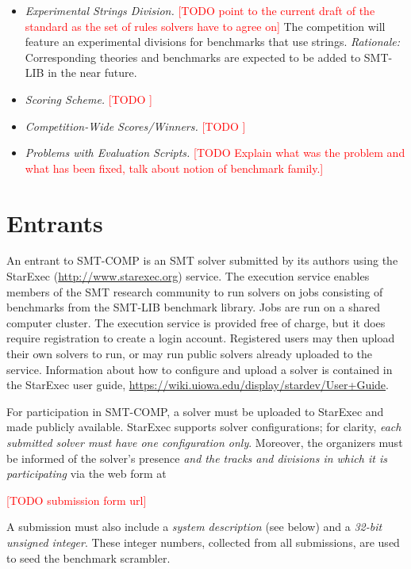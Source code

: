 \documentclass[12pt]{article}
\newcommand{\rem}[1]{\textcolor{red}{[#1]}}
\newcommand{\todo}[1]{\rem{TODO #1}}
\begin{document}
\begin{itemize}
  \item {\it Experimental Strings Division.}
    \todo{point to the current draft of the standard as the set of rules
    solvers have to agree on}
    The competition will feature an experimental divisions for
  benchmarks that use strings.  \emph{Rationale:} Corresponding
  theories and benchmarks are expected to be added to SMT-LIB in the
  near future.

  \item {\it Scoring Scheme.} \todo{}

  \item {\it Competition-Wide Scores/Winners.} \todo{}

  \item {\it Problems with Evaluation Scripts.} \todo{Explain what was the
    problem and what has been fixed, talk about notion of benchmark family.}

\end{itemize}


\section{Entrants}
\label{sec:entrants}

%
An entrant to SMT-COMP is an SMT solver submitted by its authors using
the StarExec (\url{http://www.starexec.org}) service.  The execution
service enables members of the SMT research community to run solvers
on jobs consisting of benchmarks from the SMT-LIB benchmark library.
Jobs are run on a shared computer cluster.  The execution service is
provided free of charge, but it does require registration to create a
login account.  Registered users may then upload their own solvers to
run, or may run public solvers already uploaded to the service.
Information about how to configure and upload a solver is contained in
the StarExec user guide,
\url{https://wiki.uiowa.edu/display/stardev/User+Guide}.

For participation in SMT-COMP, a solver must be uploaded to StarExec
and made publicly available.  StarExec supports solver configurations;
for clarity, \emph{each submitted solver must have one configuration
  only}.  Moreover, the organizers must be informed of the solver's
presence \emph{and the tracks and divisions in which it is
  participating} via the web form at
\begin{center}
  \todo{\url{}submission form url}
\end{center}
A submission must also include a \emph{system description} (see below) and a
\emph{32-bit unsigned integer}.
 These integer numbers, collected from all submissions, are used to seed the
benchmark scrambler.
\end{document}
